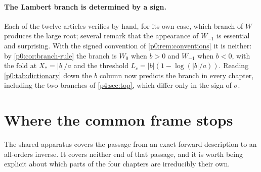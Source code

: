 \documentclass[11pt,a4paper,oneside]{book}
\theoremstyle{plain}
\theoremstyle{definition}
\theoremstyle{remark}
\newcommand{\Wlam}{W}
\begin{document}
\paragraph{The Lambert branch is determined by a sign.}
Each of the twelve articles verifies by hand, for its own case, which branch
of $\Wlam$ produces the large root; several remark that the appearance of
$\Wlam_{-1}$ is essential and surprising.  With the signed convention of
\cref{p0:rem:conventions} it is neither: by \cref{p0:cor:branch-rule} the
branch is $\Wlam_0$ when $b>0$ and $\Wlam_{-1}$ when $b<0$, with the fold at
$X_\ast=\lvert b\rvert/a$ and the threshold
$L_c=\lvert b\rvert(1-\log(\lvert b\rvert/a))$.  Reading
\cref{p0:tab:dictionary} down the $b$ column now predicts the branch in every
chapter, including the two branches of \cref{p4:sec:top}, which differ only in
the sign of $\sigma$.

\section{Where the common frame stops}\label{p5:sec:where-it-stops}

The shared apparatus covers the passage from an exact forward description to
an all-orders inverse.  It covers neither end of that passage, and it is worth
being explicit about which parts of the four chapters are irreducibly their
own.
\end{document}
